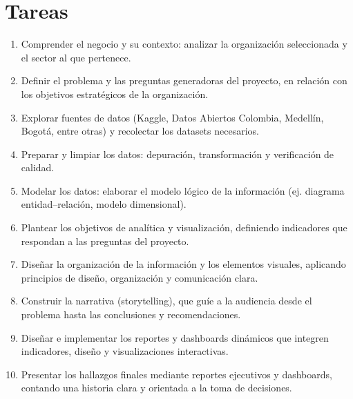 \documentclass[12pt, spanish]{article}
\begin{document}
\section*{Tareas}
\begin{enumerate}
    \item Comprender el negocio y su contexto: analizar la organización seleccionada y el sector al que pertenece.
    \item Definir el problema y las preguntas generadoras del proyecto, en relación con los objetivos estratégicos de la organización.
    \item Explorar fuentes de datos (Kaggle, Datos Abiertos Colombia, Medellín, Bogotá, entre otras) y recolectar los datasets necesarios.
    \item Preparar y limpiar los datos: depuración, transformación y verificación de calidad.
    \item Modelar los datos: elaborar el modelo lógico de la información (ej. diagrama entidad–relación, modelo dimensional).
    \item Plantear los objetivos de analítica y visualización, definiendo indicadores que respondan a las preguntas del proyecto.
    \item Diseñar la organización de la información y los elementos visuales, aplicando principios de diseño, organización y comunicación clara.
    \item Construir la narrativa (storytelling), que guíe a la audiencia desde el problema hasta las conclusiones y recomendaciones.
    \item Diseñar e implementar los reportes y dashboards dinámicos que integren indicadores, diseño y visualizaciones interactivas.
    \item Presentar los hallazgos finales mediante reportes ejecutivos y dashboards, contando una historia clara y orientada a la toma de decisiones.
\end{enumerate}
\end{document}
